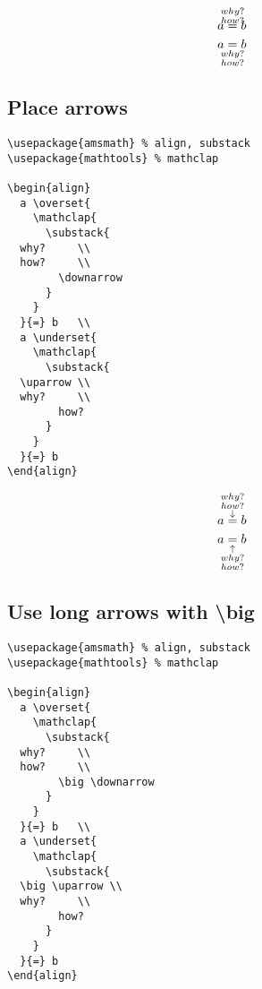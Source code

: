 \documentclass[../../latex]{subfiles}
\begin{document}
\begin{align}
  a \overset{
    \mathclap{
      \substack{
  why?   \\
        how?
      }
    }
  }{=} b \\
  a \underset{
    \mathclap{
      \substack{
  why?   \\
        how?
      }
    }
  }{=} b
\end{align}

\subsection{Place arrows}

\begin{verbatim}
\usepackage{amsmath} % align, substack
\usepackage{mathtools} % mathclap

\begin{align}
  a \overset{
    \mathclap{
      \substack{
  why?     \\
  how?     \\
        \downarrow
      }
    }
  }{=} b   \\
  a \underset{
    \mathclap{
      \substack{
  \uparrow \\
  why?     \\
        how?
      }
    }
  }{=} b
\end{align}
\end{verbatim}

\begin{align}
  a \overset{
    \mathclap{
      \substack{
  why?     \\
  how?     \\
        \downarrow
      }
    }
  }{=} b   \\
  a \underset{
    \mathclap{
      \substack{
  \uparrow \\
  why?     \\
        how?
      }
    }
  }{=} b
\end{align}

\subsection{Use long arrows with \textbackslash big}

\begin{verbatim}
\usepackage{amsmath} % align, substack
\usepackage{mathtools} % mathclap

\begin{align}
  a \overset{
    \mathclap{
      \substack{
  why?     \\
  how?     \\
        \big \downarrow
      }
    }
  }{=} b   \\
  a \underset{
    \mathclap{
      \substack{
  \big \uparrow \\
  why?     \\
        how?
      }
    }
  }{=} b
\end{align}
\end{verbatim}
\end{document}
